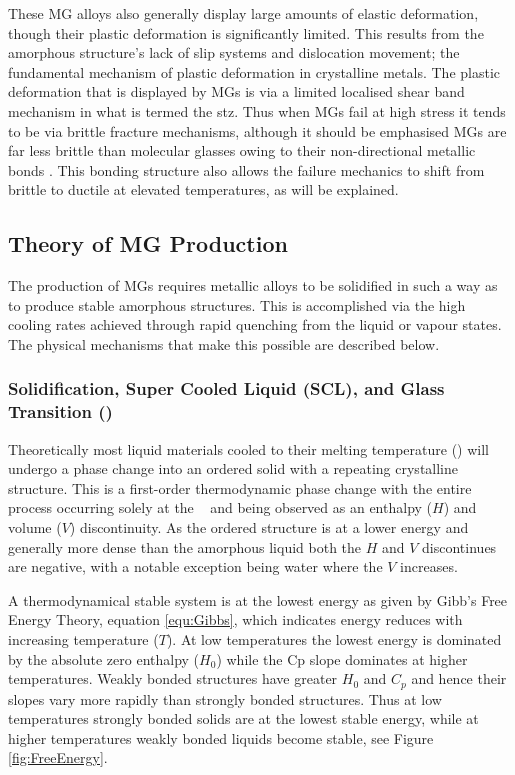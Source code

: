 \documentclass[draft,a4paper,12pt,oneside]{report}%
\begin{document}
These MG alloys also generally display large amounts of elastic deformation, though their plastic deformation is significantly limited. This results from the amorphous structure's lack of slip systems and dislocation movement; the fundamental mechanism of plastic deformation in crystalline metals. The plastic deformation that is displayed by MGs is via a limited localised shear band mechanism in what is termed the \gls{stz}.  Thus when MGs fail at high stress it tends to be via brittle fracture mechanisms, although it should be emphasised MGs are far less brittle than molecular glasses owing to their non-directional metallic bonds \cite{Greer2013}. This bonding structure also allows the failure mechanics to shift from brittle to ductile at elevated temperatures, as will be explained.

\subsection{Theory of MG Production}
The production of MGs requires metallic alloys to be solidified in such a way as to produce stable amorphous structures. This is accomplished via the high cooling rates achieved through rapid quenching from the liquid or vapour states. The physical mechanisms that make this possible are described below.  


\subsubsection{Solidification, Super Cooled Liquid (SCL), and Glass Transition (\Tm)} \label{sec:Gibbs}
Theoretically most liquid materials cooled to their melting temperature (\Tm) will undergo a phase change into an ordered solid with a repeating crystalline structure. This is a first-order thermodynamic phase change with the entire process occurring solely at the \Tm~ and being observed as an enthalpy ($H$) and volume ($V$) discontinuity. As the ordered structure is at a lower energy and generally more dense than the amorphous liquid both the $H$ and $V$ discontinues are negative, with a notable exception being water where the $V$ increases.
 
A thermodynamical stable system is at the lowest energy as given by Gibb's Free Energy Theory, equation \ref{equ:Gibbs}, which indicates energy reduces with increasing temperature ($T$). At low temperatures the lowest energy is dominated by the absolute zero enthalpy ($H_{0}$) while the \gls{Cp} slope dominates at higher temperatures. Weakly bonded structures have greater $H_{0}$ and $C_{p}$ and hence their slopes vary more rapidly than strongly bonded structures. Thus at low temperatures strongly bonded solids are at the lowest stable energy, while at higher temperatures weakly bonded liquids become stable, see Figure \ref{fig:FreeEnergy}. 
\end{document}
